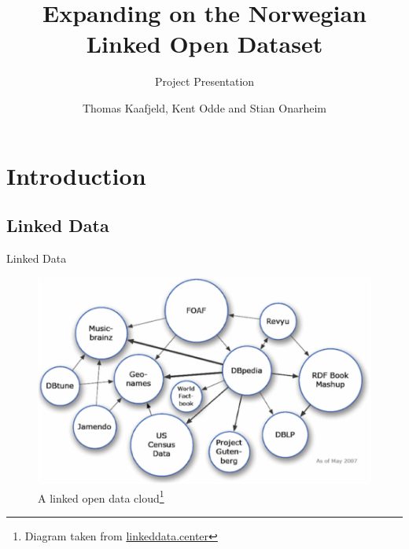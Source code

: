 \documentclass{beamer}
\title{Expanding on the Norwegian Linked Open Dataset} %
\subtitle{Project Presentation} %
\author{Thomas Kaafjeld, Kent Odde and Stian Onarheim}
\begin{document}
\frame{\maketitle}


	\section{Introduction}

	\subsection{Linked Data}
	\begin{frame}{Linked Data}

		\begin{figure}
			\includegraphics[scale=0.40]{resources/lod.png}
			\caption{A linked open data cloud\footnote[frame]{%
				Diagram taken from \url{linkeddata.center} }}
		\end{figure}
	\end{frame}
\end{document}
